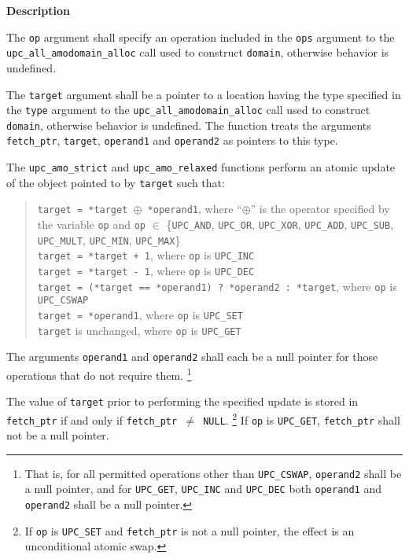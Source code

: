 {\bf Description}

\np The {\tt op} argument shall specify an operation included in the {\tt ops}
    argument to the {\tt upc\_all\_amodomain\_alloc} call used to construct
    {\tt domain}, otherwise behavior is undefined.

\np The {\tt target} argument shall be a pointer to a location having the type
    specified in the {\tt type} argument to the {\tt upc\_all\_amodomain\_alloc} 
    call used to construct {\tt domain}, otherwise behavior is undefined. 
    The function treats the arguments {\tt fetch\_ptr}, {\tt target}, 
    {\tt operand1} and {\tt operand2} as pointers to this type.

\np The {\tt upc\_amo\_strict} and {\tt upc\_amo\_relaxed} functions perform
    an atomic update of the object pointed to by {\tt target} such that:

    \begin{verse}
      {\tt *target = *target $\oplus$ *operand1},
        where ``$\oplus$'' is the operator specified by the variable {\tt op}
        and {\tt op} $\in$ \{{\tt UPC\_AND}, {\tt UPC\_OR}, {\tt UPC\_XOR},
        {\tt UPC\_ADD}, {\tt UPC\_SUB}, {\tt UPC\_MULT}, {\tt UPC\_MIN}, {\tt UPC\_MAX}\} \\
      {\tt *target = *target + 1}, 
        where {\tt op} is {\tt UPC\_INC} \\
      {\tt *target = *target - 1}, 
        where {\tt op} is {\tt UPC\_DEC} \\
      {\tt *target = (*target == *operand1) ? *operand2 : *target},
        where {\tt op} is {\tt UPC\_CSWAP} \\
      {\tt *target = *operand1},
        where {\tt op} is {\tt UPC\_SET} \\
      {\tt *target} is unchanged,
        where {\tt op} is {\tt UPC\_GET} \\
    \end{verse}

\np The arguments {\tt operand1} and {\tt operand2} shall each be a null
    pointer for those operations that do not require them.%
    \footnote{That is, for all permitted operations other than {\tt UPC\_CSWAP},
    {\tt operand2} shall be a null pointer, and for {\tt UPC\_GET}, {\tt UPC\_INC} and {\tt UPC\_DEC}
    both {\tt operand1} and {\tt operand2} shall be a null pointer.}

\np The value of {\tt *target} prior to performing
    the specified update is stored in {\tt *fetch\_ptr} if and only if
    {\tt fetch\_ptr $\neq$ NULL}.%
    \footnote{If {\tt op} is {\tt UPC\_SET} and {\tt fetch\_ptr} is
    not a null pointer, the effect is an unconditional atomic swap.}
    If {\tt op} is {\tt UPC\_GET}, {\tt fetch\_ptr} shall not be a null pointer.

